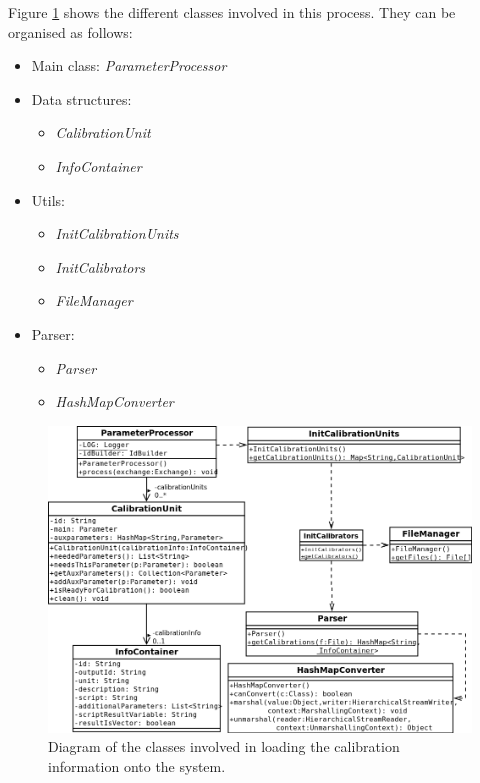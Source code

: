 Figure \ref{f5.2} shows the different classes involved in this process. They can be organised as follows:
\begin{itemize}
\item Main class: \emph{ParameterProcessor}
\item Data structures:
	\begin{itemize}
		\item \emph{CalibrationUnit}
		\item \emph{InfoContainer}
	\end{itemize}
\item Utils:
	\begin{itemize}
		\item \emph{InitCalibrationUnits}
		\item \emph{InitCalibrators}
		\item \emph{FileManager}
	\end{itemize}
\item Parser:
	\begin{itemize}
		\item \emph{Parser}
		\item \emph{HashMapConverter}
	\end{itemize}
\end{itemize}


\begin{figure}[H]
\centerline{\includegraphics[width=1\textwidth]{images/LoadInfoClassDiagram.png}}
\caption{Diagram of the classes involved in loading the calibration information onto the system.}
\label{f5.2}
\end{figure}




